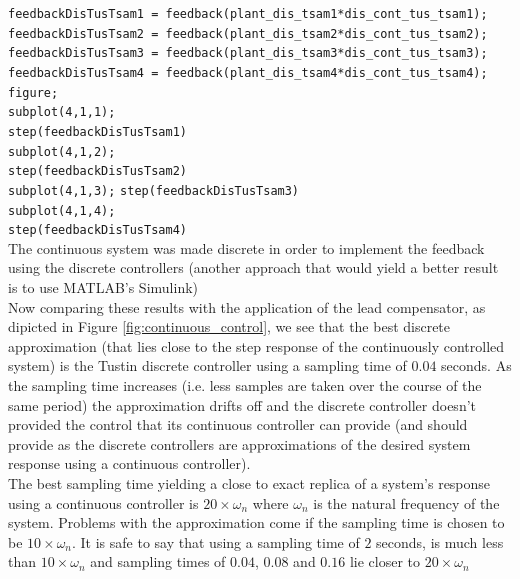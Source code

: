 \documentclass[a4paper, 12pt]{article}
\begin{document}
  \noindent
  \texttt{feedbackDisTusTsam1 = feedback(plant\_dis\_tsam1*dis\_cont\_tus\_tsam1);}\\
  \texttt{feedbackDisTusTsam2 = feedback(plant\_dis\_tsam2*dis\_cont\_tus\_tsam2);}\\
  \texttt{feedbackDisTusTsam3 = feedback(plant\_dis\_tsam3*dis\_cont\_tus\_tsam3);}\\
  \texttt{feedbackDisTusTsam4 = feedback(plant\_dis\_tsam4*dis\_cont\_tus\_tsam4);}\\
  
  \noindent
  \texttt{figure;}\\
  \texttt{subplot(4,1,1);}\\
  \texttt{step(feedbackDisTusTsam1)}\\
  \texttt{subplot(4,1,2);}\\
  \texttt{step(feedbackDisTusTsam2)}\\
  \texttt{subplot(4,1,3);}
  \texttt{step(feedbackDisTusTsam3)}\\
  \texttt{subplot(4,1,4);}\\
  \texttt{step(feedbackDisTusTsam4)}\\

The continuous system was made discrete in order to implement the feedback using the discrete controllers (another approach that would yield a better result is to use MATLAB's Simulink)\\

Now comparing these results with the application of the lead compensator, as dipicted in Figure \ref{fig:continuous_control}, we see that the best discrete approximation (that lies close to the step response of the continuously controlled system) is the Tustin discrete controller using a sampling time of $0.04$ seconds. As the sampling time increases (i.e. less samples are taken over the course of the same period) the approximation drifts off and the discrete controller doesn't provided the control that its continuous controller can provide (and should provide as the discrete controllers are approximations of the desired system response using a continuous controller).\\

The best sampling time yielding a close to exact replica of a system's response using a continuous controller is $20\times \omega_n$ where $\omega_n$ is the natural frequency of the system. Problems with the approximation come if the sampling time is chosen to be $10\times \omega_n$. It is safe to say that using a sampling time of $2$ seconds, is much less than $10\times \omega_n$ and sampling times of $0.04$, $0.08$ and $0.16$ lie closer to $20\times \omega_n$
\end{document}
